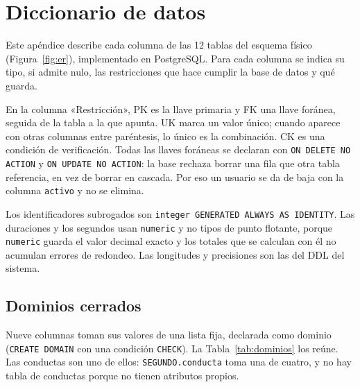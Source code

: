 
\chapter{Diccionario de datos}
\label{ap:diccionario}

Este apéndice describe cada columna de las 12 tablas del esquema físico
(Figura~\ref{fig:er}), implementado en PostgreSQL. Para cada columna se indica su
tipo, si admite nulo, las restricciones que hace cumplir la base de datos y qué
guarda.

En la columna «Restricción», PK es la llave primaria y FK una llave foránea, seguida
de la tabla a la que apunta. UK marca un valor único; cuando aparece con otras
columnas entre paréntesis, lo único es la combinación. CK es una condición de
verificación. Todas las llaves foráneas se declaran con \texttt{ON DELETE NO ACTION}
y \texttt{ON UPDATE NO ACTION}: la base rechaza borrar una fila que otra tabla
referencia, en vez de borrar en cascada. Por eso un usuario se da de baja con la
columna \texttt{activo} y no se elimina.

Los identificadores subrogados son \texttt{integer GENERATED ALWAYS AS IDENTITY}.
Las duraciones y los segundos usan \texttt{numeric} y no tipos de
punto flotante, porque \texttt{numeric} guarda el valor decimal exacto y los
totales que se calculan con él no acumulan errores de redondeo.
Las longitudes y precisiones son las del DDL del sistema.

\section*{Dominios cerrados}

Nueve columnas toman sus valores de una lista fija, declarada como dominio
(\texttt{CREATE DOMAIN} con una condición \texttt{CHECK}). La Tabla~\ref{tab:dominios}
los reúne. Las conductas son uno de ellos: \texttt{SEGUNDO.conducta} toma una de
cuatro, y no hay tabla de conductas porque no tienen atributos propios.

